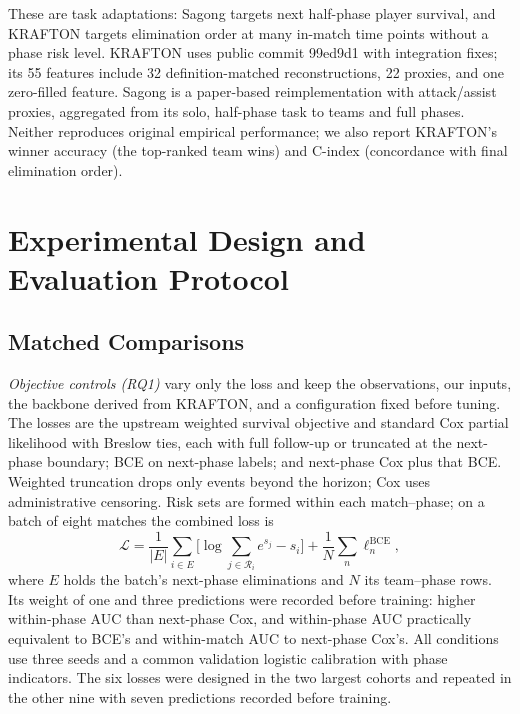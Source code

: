 \documentclass[sigconf,anonymous,nonacm]{acmart}
\begin{document}
These are task adaptations: Sagong targets next half-phase player survival, and KRAFTON targets elimination order at many in-match time points without a phase risk level. KRAFTON uses public commit 99ed9d1 with integration fixes; its 55 features include 32 definition-matched reconstructions, 22 proxies, and one zero-filled feature. Sagong is a paper-based reimplementation with attack/assist proxies, aggregated from its solo, half-phase task to teams and full phases. Neither reproduces original empirical performance; we also report KRAFTON's winner accuracy (the top-ranked team wins) and C-index (concordance with final elimination order).

\section{Experimental Design and Evaluation Protocol}
\label{sec:method:evaluation}
\subsection{Matched Comparisons}
\label{sec:method:decomposition}
\emph{Objective controls (RQ1)} vary only the loss and keep the observations, our inputs, the backbone derived from KRAFTON, and a configuration fixed before tuning. The losses are the upstream weighted survival objective and standard Cox partial likelihood with Breslow ties, each with full follow-up or truncated at the next-phase boundary; BCE on next-phase labels; and next-phase Cox plus that BCE. Weighted truncation drops only events beyond the horizon; Cox uses administrative censoring. Risk sets are formed within each match--phase; on a batch of eight matches the combined loss is
\begin{equation}
\mathcal{L}=\frac{1}{|E|}\sum_{i\in E}\Big[\log\sum_{j\in\mathcal{R}_i}e^{s_j}-s_i\Big]+\frac{1}{N}\sum_{n}\ell^{\mathrm{BCE}}_n,
\label{eq:combined}
\end{equation}
where $E$ holds the batch's next-phase eliminations and $N$ its team--phase rows. Its weight of one and three predictions were recorded before training: higher within-phase AUC than next-phase Cox, and within-phase AUC practically equivalent to BCE's and within-match AUC to next-phase Cox's. All conditions use three seeds and a common validation logistic calibration with phase indicators. The six losses were designed in the two largest cohorts and repeated in the other nine with seven predictions recorded before training.
\end{document}
